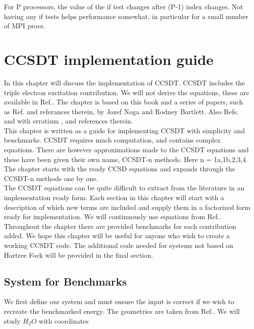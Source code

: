 \documentclass[a4paper,norsk,11pt,twoside]{report}
\begin{document}
For P processors, the value of the if test changes after (P-1) index changes. Not having any if tests helps performance somewhat, in particular for a small number of MPI procs.

\chapter{CCSDT implementation guide \label{ccsdt_chapter}}
In this chapter will discuss the implementation of CCSDT. CCSDT includes the triple electron excitation contribution. We will not derive the equations, these are available in Ref.\cite{CCSDT-ref4}. The chapter is based on this book and a series of papers, such as Ref.\cite{CCSDT-ref3} and referances therein, by Jozef Noga and Rodney Bartlett. Also Refs. \cite{CCSDT-ref5} and \cite{CCSDT-ref1} with erratium \cite{CCSDT-ref2}, and references therein. \\

This chapter is written as a guide for implementing CCSDT with simplicity and benchmarks. CCSDT requires much computation, and contains complex equations. There are however approximations made to the CCSDT equations and these have been given their own name, CCSDT-n methods. Here n = 1a,1b,2,3,4. The chapter starts with the ready CCSD equations and expands through the CCSDT-n methods one by one. \\

The CCSDT equations can be quite difficult to extract from the literature in an implementation ready form. Each section in this chapter will start with a description of which new terms are included and supply them in a factorized form ready for implementation. We will continuously use equations from Ref.\cite{CCSDT-ref4}. \\

Throughout the chapter there are provided benchmarks for each contribution added. We hope this chapter will be useful for anyone who wish to create a working CCSDT code. The additional code needed for systems not based on Hartree Fock will be provided in the final section.

\section{System for Benchmarks}
We first define our system and must ensure the input is correct if we wish to recreate the benchmarked energy. The geometries are taken from Ref.\cite{CCSDT-ref10}. We will study $H_2O$ with coordinates \\
\end{document}
